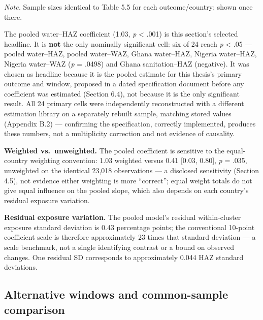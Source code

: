 \begin{ThesisTableNote}

\emph{Note.} Sample sizes identical to Table 5.5 for each outcome/country; shown once there.

\end{ThesisTableNote}

The pooled water--HAZ coefficient (1.03, \emph{p} \textless{} .001) is this section's selected headline. It is \textbf{not} the only nominally significant cell: six of 24 reach \emph{p} \textless{} .05 --- pooled water--HAZ, pooled water--WAZ, Ghana water--HAZ, Nigeria water--HAZ, Nigeria water--WAZ (\emph{p} = .0498) and Ghana sanitation--HAZ (negative). It was chosen as headline because it is the pooled estimate for this thesis's primary outcome and window, proposed in a dated specification document before any coefficient was estimated (Section 6.4), not because it is the only significant result. All 24 primary cells were independently reconstructed with a different estimation library on a separately rebuilt sample, matching stored values (Appendix B.2) --- confirming the specification, correctly implemented, produces these numbers, not a multiplicity correction and not evidence of causality.

\textbf{Weighted vs.~unweighted.} The pooled coefficient is sensitive to the equal-country weighting convention: 1.03 weighted versus 0.41 {[}0.03, 0.80{]}, \emph{p} = .035, unweighted on the identical 23,018 observations --- a disclosed sensitivity (Section 4.5), not evidence either weighting is more ``correct''; equal weight totals do not give equal influence on the pooled slope, which also depends on each country's residual exposure variation.

\textbf{Residual exposure variation.} The pooled model's residual within-cluster exposure standard deviation is 0.43 percentage points; the conventional 10-point coefficient scale is therefore approximately 23 times that standard deviation --- a scale benchmark, not a single identifying contrast or a bound on observed changes. One residual SD corresponds to approximately 0.044 HAZ standard deviations.

\subsection{Alternative windows and common-sample comparison}\label{sec:5.7}


